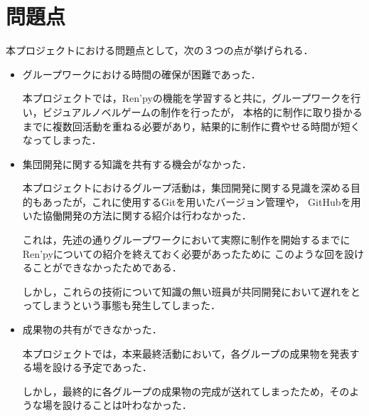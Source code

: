 \section{問題点}

  本プロジェクトにおける問題点として，次の３つの点が挙げられる．

  \begin{itemize}
    \item グループワークにおける時間の確保が困難であった．
    
      本プロジェクトでは，Ren'pyの機能を学習すると共に，グループワークを行い，ビジュアルノベルゲームの制作を行ったが，
      本格的に制作に取り掛かるまでに複数回活動を重ねる必要があり，結果的に制作に費やせる時間が短くなってしまった．
    
    \item 集団開発に関する知識を共有する機会がなかった．
    
      本プロジェクトにおけるグループ活動は，集団開発に関する見識を深める目的もあったが，これに使用するGitを用いたバージョン管理や，
      GitHubを用いた協働開発の方法に関する紹介は行わなかった．

      これは，先述の通りグループワークにおいて実際に制作を開始するまでにRen'pyについての紹介を終えておく必要があったために
      このような回を設けることができなかったためである．

      しかし，これらの技術について知識の無い班員が共同開発において遅れをとってしまうという事態も発生してしまった．
    
    \item 成果物の共有ができなかった．
    
      本プロジェクトでは，本来最終活動において，各グループの成果物を発表する場を設ける予定であった．

      しかし，最終的に各グループの成果物の完成が送れてしまったため，そのような場を設けることは叶わなかった．
  \end{itemize}
